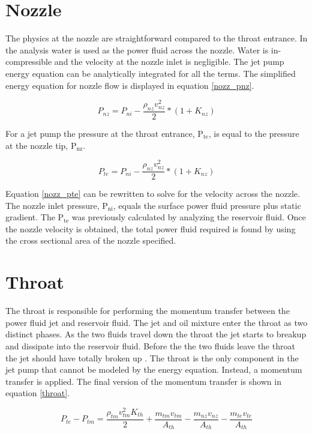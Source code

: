 \documentclass[12 pt]{report}
\newcommand{\pte}{$\mathrm{P_{te}}$\xspace}  %
\newcommand{\pnz}{$\mathrm{P_{nz}}$\xspace}  %
\newcommand{\pni}{$\mathrm{P_{ni}}$\xspace}  %
\begin{document}
\section{Nozzle}

The physics at the nozzle are straightforward compared to the throat entrance. In the analysis water is used as the power fluid across the nozzle. Water is in-compressible and the velocity at the nozzle inlet is negligible. The jet pump energy equation can be analytically integrated for all the terms. The simplified energy equation for nozzle flow is displayed in equation \eqref{nozz_pnz}.

\begin{equation}
P_{nz} = P_{ni} - \frac{\rho_{nz}v_{nz}^2}{2}*(1+K_{nz})
\label{nozz_pnz}
\end{equation}

For a jet pump the pressure at the throat entrance, \pte, is equal to the pressure at the nozzle tip, \pnz.

\begin{equation}
P_{te} = P_{ni} - \frac{\rho_{nz}v_{nz}^2}{2}*(1+K_{nz})
\label{nozz_pte}
\end{equation}

Equation \eqref{nozz_pte} can be rewritten to solve for the velocity across the nozzle. The nozzle inlet pressure, \pni, equals the surface power fluid pressure plus static gradient. The \pte was previously calculated by analyzing the reservoir fluid. Once the nozzle velocity is obtained, the total power fluid required is found by using the cross sectional area of the nozzle specified.

\section{Throat}

The throat is responsible for performing the momentum transfer between the power fluid jet and reservoir fluid. The jet and oil mixture enter the throat as two distinct phases. As the two fluids travel down the throat the jet starts to breakup and dissipate into the reservoir fluid. Before the the two fluids leave the throat the jet should have totally broken up \cite{cunn_break}. The throat is the only component in the jet pump that cannot be modeled by the energy equation. Instead, a momentum transfer is applied. The final version of the momentum transfer is shown in equation \eqref{throat}.

\begin{equation}
P_{te} - P_{tm} = \frac{\rho_{tm}v_{tm}^{2}K_{th}}{2} 
 + \frac{m_{tm}v_{tm}}{A_{th}} - \frac{m_{nz}v_{nz}}{A_{th}} - \frac{m_{te}v_{te}}{A_{th}}
\label{throat}
\end{equation}
\end{document}
